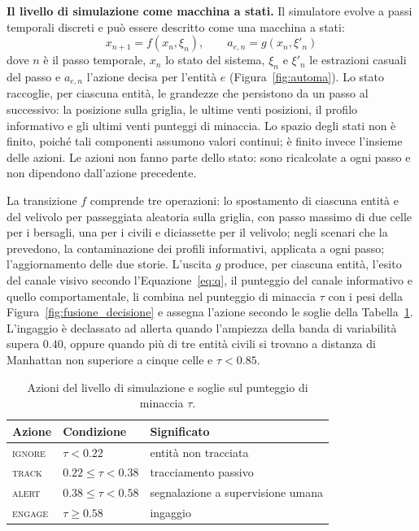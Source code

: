 \ifstampa\documentclass[a4paper,12pt,twoside,openright]{report}\else\documentclass[a4paper,12pt]{report}\fi
\newif\ifrevisione \revisionefalse
\DeclareRobustCommand{\rev}[1]{\ifrevisione{\color{blue!65!black}#1}\else#1\fi}
\newcommand{\notarev}[1]{\ifrevisione\par\medskip\noindent\fcolorbox{blue!65!black}{blue!4}{\parbox{\dimexpr\linewidth-2\fboxsep-2\fboxrule\relax}{\small\setstretch{1}\textbf{Nota per la revisione.} #1}}\par\medskip\fi}
\begin{document}
\notarev{Nella Figura~\ref{fig:fusione_decisione} e nel testo la fusione era
descritta come aggiornamento bayesiano con probabilità a priori $0.50$: con
tale valore l'aggiornamento restituisce il punteggio in ingresso, e la
fusione è quindi una combinazione lineare pesata. La descrizione è stata
allineata; il codice e i risultati non cambiano.}

\rev{\textbf{Il livello di simulazione come macchina a stati.}
\label{sec:automa}
Il simulatore evolve a passi temporali discreti e può essere descritto come
una macchina a stati:
\begin{equation}
    x_{n+1} = f(x_n, \xi_n), \qquad a_{e,n} = g(x_n, \xi'_n)
    \label{eq:automa}
\end{equation}
dove $n$ è il passo temporale, $x_n$ lo stato del sistema, $\xi_n$ e
$\xi'_n$ le estrazioni casuali del passo e $a_{e,n}$ l'azione decisa per
l'entità $e$ (Figura~\ref{fig:automa}). Lo stato raccoglie, per ciascuna
entità, le grandezze che persistono da un passo al successivo: la posizione
sulla griglia, le ultime venti posizioni, il profilo informativo e gli ultimi
venti punteggi di minaccia. Lo spazio degli stati non è finito, poiché tali
componenti assumono valori continui; è finito invece l'insieme delle azioni.
Le azioni non fanno parte dello stato: sono ricalcolate a ogni passo e non
dipendono dall'azione precedente.

La transizione $f$ comprende tre operazioni: lo spostamento di ciascuna entità
e del velivolo per passeggiata aleatoria sulla griglia, con passo massimo di
due celle per i bersagli, una per i civili e diciassette per il velivolo; negli
scenari che la prevedono, la contaminazione dei profili informativi, applicata
a ogni passo; l'aggiornamento delle due storie. L'uscita $g$ produce, per
ciascuna entità, l'esito del canale visivo secondo l'Equazione~\ref{eq:q}, il
punteggio del canale informativo e quello comportamentale, li combina nel
punteggio di minaccia $\tau$ con i pesi della Figura~\ref{fig:fusione_decisione}
e assegna l'azione secondo le soglie della Tabella~\ref{tab:azioni}.
L'ingaggio è declassato ad allerta quando l'ampiezza della banda di
variabilità supera $0.40$, oppure quando più di tre entità civili si trovano a
distanza di Manhattan non superiore a cinque celle e $\tau < 0.85$.

\begin{table}[htbp]
\centering
\begin{tabular}{lll}
\toprule
Azione & Condizione & Significato \\
\midrule
\textsc{ignore} & $\tau < 0.22$ & entità non tracciata \\
\textsc{track} & $0.22 \le \tau < 0.38$ & tracciamento passivo \\
\textsc{alert} & $0.38 \le \tau < 0.58$ & segnalazione a supervisione umana \\
\textsc{engage} & $\tau \ge 0.58$ & ingaggio \\
\bottomrule
\end{tabular}
\caption{\rev{Azioni del livello di simulazione e soglie sul punteggio di minaccia $\tau$.}}
\label{tab:azioni}
\end{table}

}
\end{document}
